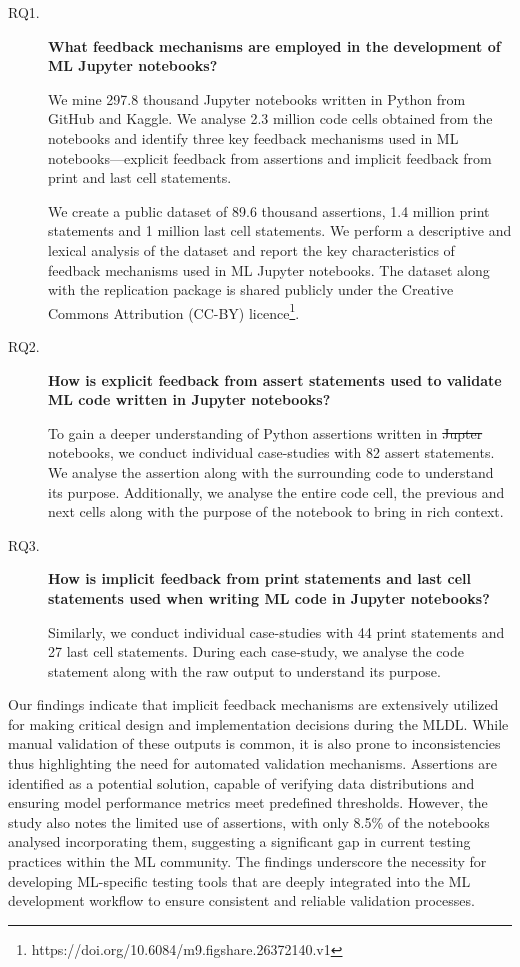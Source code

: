 \documentclass[smallextended]{svjour3}       %
\providecommand{\DIFadd}[1]{{\protect\color{blue}\uwave{#1}}} %
\providecommand{\DIFdel}[1]{{\protect\color{red}\sout{#1}}} %
\providecommand{\DIFaddbegin}{} %
\providecommand{\DIFaddend}{} %
\providecommand{\DIFdelbegin}{} %
\providecommand{\DIFdelend}{} %
\newcommand{\DIFscaledelfig}{0.5}
\newlength{\DIFdelgraphicswidth} %
\newlength{\DIFdelgraphicsheight} %
\newcommand{\DIFaddincludegraphics}[2][]{{\color{blue}\fbox{\DIFOincludegraphics[#1]{#2}}}} %
\newcommand{\DIFdelincludegraphics}[2][]{%
\sbox{\DIFdelgraphicsbox}{\DIFOincludegraphics[#1]{#2}}%
\settoboxwidth{\DIFdelgraphicswidth}{\DIFdelgraphicsbox} %
\settoboxtotalheight{\DIFdelgraphicsheight}{\DIFdelgraphicsbox} %
\scalebox{\DIFscaledelfig}{%
\parbox[b]{\DIFdelgraphicswidth}{\usebox{\DIFdelgraphicsbox}\\[-\baselineskip] \rule{\DIFdelgraphicswidth}{0em}}\llap{\resizebox{\DIFdelgraphicswidth}{\DIFdelgraphicsheight}{%
\setlength{\unitlength}{\DIFdelgraphicswidth}%
\begin{picture}(1,1)%
\thicklines\linethickness{2pt} %
{\color[rgb]{1,0,0}\put(0,0){\framebox(1,1){}}}%
{\color[rgb]{1,0,0}\put(0,0){\line( 1,1){1}}}%
{\color[rgb]{1,0,0}\put(0,1){\line(1,-1){1}}}%
\end{picture}%
}\hspace*{3pt}}} %
} %
\DeclareRobustCommand{\DIFaddbegin}{\DIFOaddbegin \let\includegraphics\DIFaddincludegraphics} %
\DeclareRobustCommand{\DIFaddend}{\DIFOaddend \let\includegraphics\DIFOincludegraphics} %
\DeclareRobustCommand{\DIFdelbegin}{\DIFOdelbegin \let\includegraphics\DIFdelincludegraphics} %
\DeclareRobustCommand{\DIFdelend}{\DIFOaddend \let\includegraphics\DIFOincludegraphics} %
\begin{document}
\begin{description}
	\item[RQ1.] \textbf{What feedback mechanisms are employed in the development of ML Jupyter notebooks?}

	      We mine 297.8 thousand Jupyter notebooks written in Python from GitHub and Kaggle. We analyse 2.3 million code cells obtained from the notebooks and identify three key feedback mechanisms used in ML notebooks---explicit feedback from assertions and implicit feedback from print and last cell statements.

	      We create a public dataset of 89.6 thousand assertions, 1.4 million print statements and 1 million last cell statements. We perform a descriptive and lexical analysis of the dataset and report the key characteristics of feedback mechanisms used in ML Jupyter notebooks. The dataset along with the replication package is shared publicly under the Creative Commons Attribution (CC-BY) licence\footnote{https://doi.org/10.6084/m9.figshare.26372140.v1}.

	\item[RQ2.] \textbf{How is explicit feedback from assert statements used to validate ML code written in Jupyter notebooks?}

	      To gain a deeper understanding of Python assertions written in \DIFdelbegin \DIFdel{Jupter }\DIFdelend \DIFaddbegin \DIFadd{Jupyter }\DIFaddend notebooks, we conduct individual case-studies with 82 assert statements. We analyse the assertion along with the surrounding code to understand its purpose. Additionally, we analyse the entire code cell, the previous and next cells along with the purpose of the notebook to bring in rich context.

	\item[RQ3.] \textbf{How is implicit feedback from print statements and last cell statements used when writing ML code in Jupyter notebooks?}

	      Similarly, we conduct individual case-studies with 44 print statements and 27 last cell statements. During each case-study, we analyse the code statement along with the raw output to understand its purpose.
\end{description}

Our findings indicate that implicit feedback mechanisms are extensively utilized for making critical design and implementation decisions during the MLDL. While manual validation of these outputs is common, it is also prone to inconsistencies thus highlighting the need for automated validation mechanisms. Assertions are identified as a potential solution, capable of verifying data distributions and ensuring model performance metrics meet predefined thresholds. However, the study also notes the limited use of assertions, with only 8.5\% of the notebooks analysed incorporating them, suggesting a significant gap in current testing practices within the ML community. The findings underscore the necessity for developing ML-specific testing tools that are deeply integrated into the ML development workflow to ensure consistent and reliable validation processes.
\end{document}
